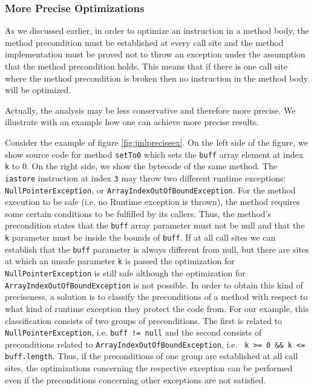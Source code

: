\subsubsection{More Precise Optimizations}

\label{section:optimprecise}

As we discussed earlier, in order to optimize an instruction in a method body, the method precondition must be established at every call site and the method implementation must be proved not to throw an exception under the assumption that the method precondition holds. This means that if there is one call site where the method precondition is broken then no instruction in the method body will be optimized.

Actually, the analysis may be less conservative and therefore more precise. We illustrate with an example how
one can achieve more precise results.

Consider the example of figure \ref{fig:jmlpreciseex}. On the left side of the figure, we show source code for method \verb!setTo0! which sets the \verb!buff! array element at index \verb!k! to 0. On the right side, we show the bytecode of the same method. The \texttt{iastore} instruction at index \texttt{3} may throw two different runtime exceptions: \texttt{NullPointerException}, or \texttt{ArrayIndexOutOfBoundException}. For the method execution to be safe (i.e. no Runtime exception is thrown), the method requires some certain conditions to be fulfilled by its callers. Thus, the method's precondition states that the \verb!buff! array parameter must not be null and that the \verb!k! parameter must be inside the bounds of \verb!buff!. If at all call sites we can establish that the \verb!buff! parameter is always different from null, but there are sites at which an unsafe parameter \verb!k! is passed the optimization for \texttt{NullPointerException} is still safe although the optimization for \texttt{ArrayIndexOutOfBoundException} is not possible. In order to obtain this kind of preciseness, a solution is to classify the preconditions of a method with respect to what kind of runtime exception they protect the code from. For our example, this classification consists of two groups of preconditions. The first is related to \texttt{NullPointerException}, i.e. \texttt{buff != null} and the second consists of preconditions related to \texttt{ArrayIndexOutOfBoundException}, i.e. \verb! k >= 0 && k <= buff.length!. Thus, if the preconditions of one group are established at all call sites, the optimizations concerning the respective exception can be performed even if the preconditions concerning other exceptions are not satisfied.

